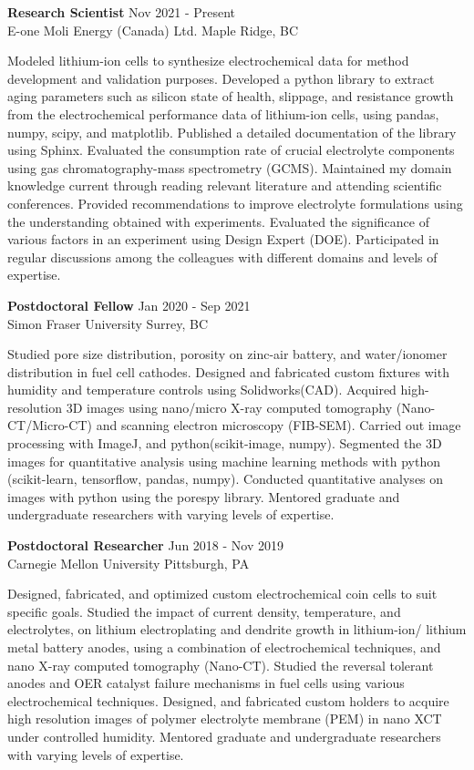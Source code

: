 \documentclass[11pt]{article}
\newcommand{\employment}[5]{\noindent \textbf{#1} \hfill #2 \\ #3 \hfill #4 \par #5}
\newcommand{\highlight}[1]{{\semibold#1}}
\begin{document}
\employment
    {Research Scientist}
    {Nov 2021 - Present}
    {E-one Moli Energy (Canada) Ltd.}
    {Maple Ridge, BC}
    {\highlight{Modeled lithium-ion cells} to synthesize electrochemical data for method development and validation purposes. \highlight{Developed a python library} to extract aging parameters such as \highlight{silicon state of health, slippage}, and \highlight{resistance growth} from the \highlight{electrochemical performance} data of lithium-ion cells, using \highlight{pandas, numpy, scipy}, and \highlight{matplotlib}. Published a detailed \highlight{documentation} of the library using Sphinx.  Evaluated the \highlight{consumption rate} of crucial \highlight{electrolyte components} using gas chromatography-mass spectrometry \highlight{(GCMS)}. Maintained my domain knowledge current through reading relevant literature and attending scientific conferences. Provided recommendations to improve \highlight{electrolyte formulations} using the understanding obtained with experiments. Evaluated the significance of various factors in an experiment using \highlight{Design Expert (DOE)}. Participated in regular discussions among the colleagues with different domains and levels of expertise.}

\employment
    {Postdoctoral Fellow}
    {Jan 2020 - Sep 2021}
    {Simon Fraser University}
    {Surrey, BC}
    {Studied \highlight{pore size distribution}, porosity on \highlight{zinc-air battery}, and \highlight{water/ionomer distribution} in \highlight{fuel cell} cathodes. Designed and fabricated custom fixtures with humidity and temperature controls using \highlight{Solidworks(CAD)}. Acquired high-resolution 3D images using nano/micro X-ray computed tomography \highlight{(Nano-CT/Micro-CT)} and scanning electron microscopy \highlight{(FIB-SEM)}. Carried out image processing with \highlight{ImageJ}, and \highlight{python(scikit-image, numpy)}. Segmented the \highlight{3D images} for \highlight{quantitative analysis} using \highlight{machine learning} methods with \highlight{python (scikit-learn, tensorflow, pandas, numpy)}. Conducted \highlight{quantitative analyses} on images with python using the \highlight{porespy} library. Mentored graduate and undergraduate researchers with varying levels of expertise.}

\employment
    {Postdoctoral Researcher}
    {Jun 2018 - Nov 2019}
    {Carnegie Mellon University}
    {Pittsburgh, PA}
    {\highlight{Designed, fabricated}, and optimized \highlight{custom electrochemical coin cells} to suit specific goals. Studied the impact of current density, temperature, and electrolytes, on \highlight{lithium electroplating and dendrite growth} in \highlight{lithium-ion/ lithium metal battery anodes}, using a combination of electrochemical techniques, and nano X-ray computed tomography \highlight{(Nano-CT)}. Studied the reversal tolerant anodes and OER catalyst failure mechanisms in \highlight{fuel cells} using various \highlight{electrochemical techniques}. Designed, and fabricated custom holders to acquire high resolution images of \highlight{polymer electrolyte membrane (PEM)} in nano XCT under controlled humidity. Mentored graduate and undergraduate researchers with varying levels of expertise.}
\end{document}
